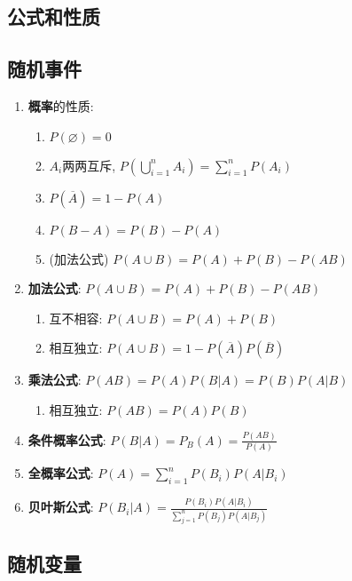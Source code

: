 \documentclass[10pt,a4paper,nofonts]{ctexart}
\newcommand{\D}{\displaystyle}
\begin{document}

\begin{multicols}{2}

\section{公式和性质}

\subsection{随机事件}

\begin{enumerate}
\item {\bf 概率}的性质: 
\begin{enumerate}
\item $P(\varnothing)=0$
\item $A_i$两两互斥, $P(\bigcup_{i=1}^{n}{A_i})=\sum_{i=1}^{n}{P(A_i)}$
\item $P(\overline{A})=1-P(A)$
\item $P(B-A)=P(B)-P(A)$
\item (加法公式) $P(A\cup B)=P(A)+P(B)-P(AB)$
\end{enumerate}

\item {\bf 加法公式}: $P(A\cup B)=P(A)+P(B)-P(AB)$
\begin{enumerate}
\item 互不相容: $P(A\cup B)=P(A)+P(B)$
\item 相互独立: $P(A\cup B)=1-P(\overline{A})P(\overline{B})$
\end{enumerate}

\item {\bf 乘法公式}: $P(AB)=P(A)P(B|A)=P(B)P(A|B)$
\begin{enumerate}
\item 相互独立: $P(AB)=P(A)P(B)$
\end{enumerate}
\item {\bf 条件概率公式}: $P(B|A)=P_B(A)=\D\frac{P(AB)}{P(A)}$
\item {\bf 全概率公式}: $P(A)=\sum_{i=1}^{n}{P(B_i)P(A|B_i)}$
\item {\bf 贝叶斯公式}: $P(B_i|A)=\D\frac{P(B_i)P(A|B_i)}{\sum_{j=1}^{n}{P(B_j)P(A|B_j)}}$

\end{enumerate}

\subsection{随机变量}


\end{multicols}
\end{document}
